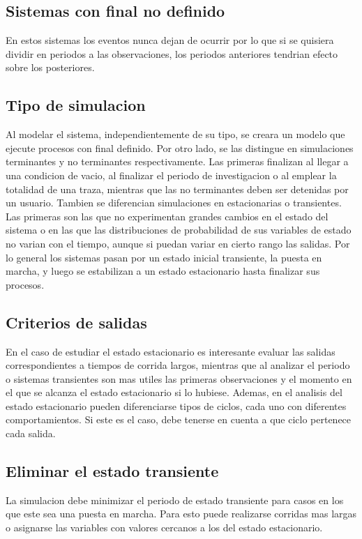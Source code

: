 \documentclass[a4paper]{article}
\begin{document}
\subsection*{Sistemas con final no definido}
En estos sistemas los eventos nunca dejan de ocurrir por lo que si se quisiera dividir en periodos a las observaciones,
los periodos anteriores tendrian efecto sobre los posteriores.

\subsection*{Tipo de simulacion}
Al modelar el sistema, independientemente de su tipo, se creara un modelo que ejecute procesos con final definido.
Por otro lado, se las distingue en simulaciones terminantes y no terminantes respectivamente.
Las primeras finalizan al llegar a una condicion de vacio, al finalizar el periodo de investigacion o al 
emplear la totalidad de una traza, mientras que las no terminantes deben ser detenidas por un usuario.
Tambien se diferencian simulaciones en estacionarias o transientes. Las primeras son las que no experimentan 
grandes cambios en el estado del sistema o en las que las distribuciones de probabilidad de sus variables de 
estado no varian con el tiempo, aunque si puedan variar en cierto rango las salidas. Por lo general los sistemas
pasan por un estado inicial transiente, la puesta en marcha, y luego se estabilizan a un estado estacionario 
hasta finalizar sus procesos.

\subsection*{Criterios de salidas}
En el caso de estudiar el estado estacionario es interesante evaluar las salidas correspondientes a tiempos de corrida largos, 
mientras que al analizar el periodo o sistemas transientes son mas utiles las primeras observaciones y el momento en el que se 
alcanza el estado estacionario si lo hubiese.
Ademas, en el analisis del estado estacionario pueden diferenciarse tipos de ciclos, cada uno con diferentes comportamientos.
Si este es el caso, debe tenerse en cuenta a que ciclo pertenece cada salida.

\subsection*{Eliminar el estado transiente}
La simulacion debe minimizar el periodo de estado transiente para casos en los que este sea una puesta en marcha. Para esto puede 
realizarse corridas mas largas o asignarse las variables con valores cercanos a los del estado estacionario.
\end{document}
